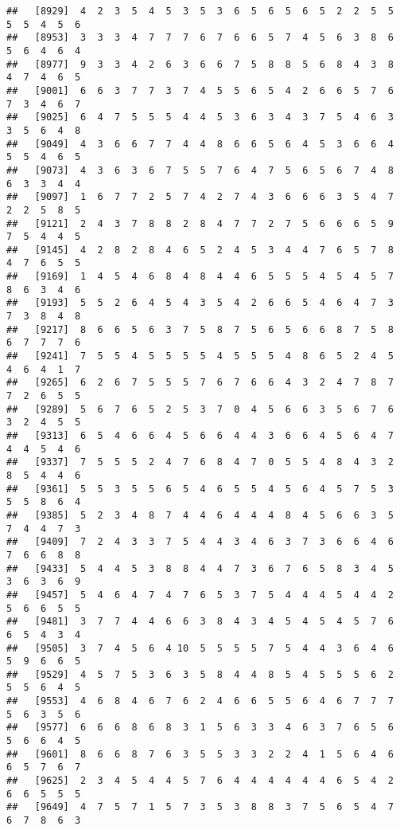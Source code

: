 \documentclass[
]{book}
\begin{document}
\begin{verbatim}
##   [8929]  4  2  3  5  4  5  3  5  3  6  5  6  5  6  5  2  2  5  5  5  5  4  5  6
##   [8953]  3  3  3  4  7  7  7  6  7  6  6  5  7  4  5  6  3  8  6  5  6  4  6  4
##   [8977]  9  3  3  4  2  6  3  6  6  7  5  8  8  5  6  8  4  3  8  4  7  4  6  5
##   [9001]  6  6  3  7  7  3  7  4  5  5  6  5  4  2  6  6  5  7  6  7  3  4  6  7
##   [9025]  6  4  7  5  5  5  4  4  5  3  6  3  4  3  7  5  4  6  3  3  5  6  4  8
##   [9049]  4  3  6  6  7  7  4  4  8  6  6  5  6  4  5  3  6  6  4  5  5  4  6  5
##   [9073]  4  3  6  3  6  7  5  5  7  6  4  7  5  6  5  6  7  4  8  6  3  3  4  4
##   [9097]  1  6  7  7  2  5  7  4  2  7  4  3  6  6  6  3  5  4  7  2  2  5  8  5
##   [9121]  2  4  3  7  8  8  2  8  4  7  7  2  7  5  6  6  6  5  9  7  5  4  4  5
##   [9145]  4  2  8  2  8  4  6  5  2  4  5  3  4  4  7  6  5  7  8  4  7  6  5  5
##   [9169]  1  4  5  4  6  8  4  8  4  4  6  5  5  5  4  5  4  5  7  8  6  3  4  6
##   [9193]  5  5  2  6  4  5  4  3  5  4  2  6  6  5  4  6  4  7  3  7  3  8  4  8
##   [9217]  8  6  6  5  6  3  7  5  8  7  5  6  5  6  6  8  7  5  8  6  7  7  7  6
##   [9241]  7  5  5  4  5  5  5  5  4  5  5  5  4  8  6  5  2  4  5  4  6  4  1  7
##   [9265]  6  2  6  7  5  5  5  7  6  7  6  6  4  3  2  4  7  8  7  7  2  6  5  5
##   [9289]  5  6  7  6  5  2  5  3  7  0  4  5  6  6  3  5  6  7  6  3  2  4  5  5
##   [9313]  6  5  4  6  6  4  5  6  6  4  4  3  6  6  4  5  6  4  7  4  4  5  4  6
##   [9337]  7  5  5  5  2  4  7  6  8  4  7  0  5  5  4  8  4  3  2  8  5  4  4  6
##   [9361]  5  5  3  5  5  6  5  4  6  5  5  4  5  6  4  5  7  5  3  5  5  8  6  4
##   [9385]  5  2  3  4  8  7  4  4  6  4  4  4  8  4  5  6  6  3  5  7  4  4  7  3
##   [9409]  7  2  4  3  3  7  5  4  4  3  4  6  3  7  3  6  6  4  6  7  6  6  8  8
##   [9433]  5  4  4  5  3  8  8  4  4  7  3  6  7  6  5  8  3  4  5  3  6  3  6  9
##   [9457]  5  4  6  4  7  4  7  6  5  3  7  5  4  4  4  5  4  4  2  5  6  6  5  5
##   [9481]  3  7  7  4  4  6  6  3  8  4  3  4  5  4  5  4  5  7  6  6  5  4  3  4
##   [9505]  3  7  4  5  6  4 10  5  5  5  5  7  5  4  4  3  6  4  6  5  9  6  6  5
##   [9529]  4  5  7  5  3  6  3  5  8  4  4  8  5  4  5  5  5  6  2  5  5  6  4  5
##   [9553]  4  6  8  4  6  7  6  2  4  6  6  5  5  6  4  6  7  7  7  5  6  3  5  6
##   [9577]  6  6  6  8  6  8  3  1  5  6  3  3  4  6  3  7  6  5  6  5  6  6  4  5
##   [9601]  8  6  6  8  7  6  3  5  5  3  3  2  2  4  1  5  6  4  6  6  5  7  6  7
##   [9625]  2  3  4  5  4  4  5  7  6  4  4  4  4  4  4  6  5  4  2  6  6  5  5  5
##   [9649]  4  7  5  7  1  5  7  3  5  3  8  8  3  7  5  6  5  4  7  6  7  8  6  3

\end{verbatim}
\end{document}
